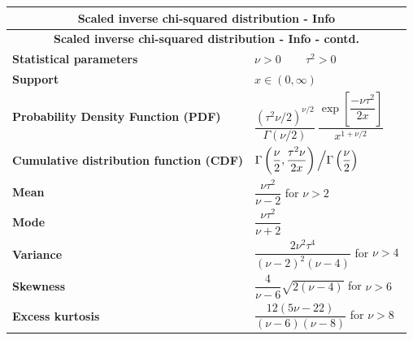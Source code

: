 \renewcommand{\arraystretch}{2}
\begin{longtable}{|m{6cm}|p{9cm}|}
    \hline
    \multicolumn{2}{|c|}{\textbf{Scaled inverse chi-squared distribution - Info} \cite{wiki/Scaled_inverse_chi-squared_distribution}} \\
    \hline\endfirsthead

    \hline
    \multicolumn{2}{|c|}{\textbf{Scaled inverse chi-squared distribution - Info - contd.} \cite{wiki/Scaled_inverse_chi-squared_distribution}} \\
    \hline\endhead
    
    \hline\endfoot
    \hline\endlastfoot

    \textbf{Statistical parameters} & 
    ${\displaystyle \nu >0\,} \quad\quad {\displaystyle \tau ^{2}>0\,}$
    \\ \hline
    
    \textbf{Support} &
    ${\displaystyle x\in (0,\infty )}$
    \\ \hline

    \textbf{Probability Density Function (PDF)} & 
    ${\displaystyle {\dfrac {(\tau ^{2}\nu /2)^{\nu /2}}{\Gamma (\nu /2)}}~{\dfrac {\exp \left[{\dfrac {-\nu \tau ^{2}}{2x}}\right]}{x^{1+\nu /2}}}}$
    \\[1ex] \hline
    
    \textbf{Cumulative distribution function (CDF)} & 
    ${\displaystyle \Gamma \left({\dfrac {\nu }{2}},{\dfrac {\tau ^{2}\nu }{2x}}\right)\left/\Gamma \left({\dfrac {\nu }{2}}\right)\right.}$
    \\ \hline

    \textbf{Mean} & 
    ${\displaystyle {\dfrac {\nu \tau ^{2}}{\nu -2}}}$ for ${\displaystyle \nu >2\,}$
    \\[1ex] \hline

    \textbf{Mode} & 
    ${\displaystyle {\dfrac {\nu \tau ^{2}}{\nu +2}}}$
    \\ \hline

    \textbf{Variance} &
    ${\displaystyle {\dfrac {2\nu ^{2}\tau ^{4}}{(\nu -2)^{2}(\nu -4)}}}$ for ${\displaystyle \nu >4\,}$
    \\[1ex] \hline

    \textbf{Skewness} &
    ${\displaystyle {\dfrac {4}{\nu -6}}{\sqrt {2(\nu -4)}}}$ for ${\displaystyle \nu >6\,}$
    \\[1ex] \hline

    \textbf{Excess kurtosis} &
    ${\displaystyle {\dfrac {12(5\nu -22)}{(\nu -6)(\nu -8)}}}$ for ${\displaystyle \nu >8\,}$
    \\[1ex] \hline


\end{longtable}

